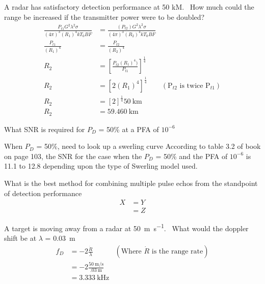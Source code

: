 \documentclass[12pt]{article}
\newenvironment{exercise}[2][Exercise]{\begin{trivlist}
    \item[\hskip \labelsep {\bfseries #1}\hskip \labelsep {\bfseries #2.}]}{\end{trivlist}}
\begin{document}
      \begin{exercise}{7}
      A radar has satisfactory detection performance at 50 kM.  How much could the range be increased if the transmitter power were to be doubled?
      \begin{align*}
      \frac{P_{t1}G^{2}\lambda^{2}\sigma}{(4\pi)^{3}(R_{1})^{4} k T_{0} B F} & = \frac{(P_{t2})G^{2}\lambda^{2}\sigma}{(4\pi)^{3}(R_{2})^{4} k T_{0} B F}\\
      \frac{P_{t1}}{(R_{1})^{4}} & = \frac{P_{t2}}{(R_{2})^{4}}\\
      R_{2} & = \left[\frac{P_{t2}(R_{1})^{4})}{P_{t1}}\right]^{\frac{1}{4}}\\
      R_{2} & = \left[2(R_{1})^{4}\right]^{\frac{1}{4}} & (\text{P$_{t2}$ is twice P$_{t1}$})\\
      R_{2} & = \left[2\right]^{\frac{1}{4}}\SI{50}{\km}\\
      R_{2} & = \SI{59.460}{\km}
      \end{align*}
      \end{exercise}
      
      \begin{exercise}{8}
      What SNR is required for $P_{D}$ = 50\% at a PFA of $10^{-6}$

      When $P_{D}$ = 50\%, need to look up a swerling curve
      According to table 3.2 of book on page 103, the SNR for the case when the $P_{D}$ = 50\% and the PFA of $10^{-6}$ is 11.1 to 12.8 depending upon the type of Swerling model used.
      \end{exercise}

      \begin{exercise}{9}
      What is the best method for combining multiple pulse echos from the standpoint of detection performance
      \begin{align*}
      X & = Y\\
      & = Z
      \end{align*}
      \end{exercise}
      
      \begin{exercise}{10}
      A target is moving away from a radar at \SI{50}{\meter\per\second}.  What would the doppler shift be at $\lambda$ = \SI{.03}{\meter}
      \begin{align*}
      f_{D} & = -2\frac{\dot{R}}{\lambda} & (\text{Where $\dot{R}$ is the range rate})\\
      & = -2\frac{\SI{50}{\meter\per\second}}{\SI{.03}{\meter}}\\
      & = \SI{3.333}{\kHz}
      \end{align*}
      \end{exercise}
      
\end{document}
